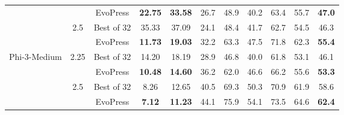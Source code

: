 \begin{table}[htb]
{\begin{tabular}{c|c|c|cc|ccccc|c}
    &  & EvoPress   & \bf{22.75} & \bf{33.58} & 26.7 & 48.9 & 40.2 & 63.4 & 55.7 & \bf{47.0} \\
    \cmidrule{2-11}
    & \multirow{2}{*}{2.5} &  Best of 32 & 35.33 & 37.09 & 24.1 & 48.4 & 41.7 & 62.7 & 54.5 & 46.3 \\
     & &   EvoPress & \bf{11.73} & \bf{19.03} & 32.2 & 63.3 & 47.5 & 71.8 & 62.3 & \bf{55.4} \\
    \midrule 
     \multirow{5}{*}{Phi-3-Medium}& \multirow{2}{*}{2.25} & Best of 32 & 14.20 & 18.19 & 28.9 & 46.8 & 40.0 & 61.8 & 53.1 & 46.1 \\
    &  & EvoPress   & \bf{10.48} & \bf{14.60} & 36.2 & 62.0 & 46.6 & 66.2 & 55.6 & \bf{53.3} \\
    \cmidrule{2-11}
    & \multirow{2}{*}{2.5} &  Best of 32 & 8.26 & 12.65 & 40.5 & 69.3 & 50.3 & 70.9 & 61.9 & 58.6 \\
     & &   EvoPress & \bf{7.12} & \bf{11.23} & 44.1 & 75.9 & 54.1 & 73.5 & 64.6 & \bf{62.4} \\
  \bottomrule
\end{tabular}
}
\label{tab:extreme_quant}
\end{table}
